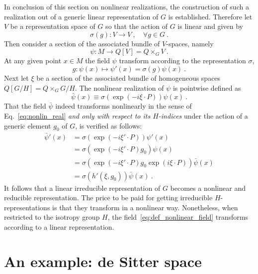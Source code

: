 \documentclass[11pt]{article}
\begin{document}
In conclusion of this section on nonlinear realizations, the 
construction of such a realization out of a generic linear 
representation of $G$ is established.
Therefore let $V$ be a representation space of $G$ so that the 
action of $G$ is linear and given by
\begin{displaymath}
	\sigma(g) : V \to V~,\quad \forall g  \in G~.
\end{displaymath}
Then consider a section of the associated bundle of $V$-spaces, 
namely
\begin{displaymath}
	\psi : M \to Q[V] = Q \times_G V~.
\end{displaymath}
At any given point $x \in M$ the field $\psi$ transform according 
to the representation $\sigma$,
\begin{displaymath}
	g : \psi(x) \mapsto \psi'(x) = \sigma(g) \psi(x)~.
\end{displaymath}
Next let $\xi$ be a section of the associated bundle of 
homogeneous spaces $Q[G/H] = Q \times_G G/H$. The nonlinear 
realization of $\psi$ is pointwise defined as
\begin{equation}\label{eq:def_nonlinear_field}
	\bar{\psi}(x) \equiv \sigma(\exp(-i\xi\cdot P))\psi(x)~.
\end{equation}
That the field $\bar{\psi}$ indeed transforms nonlinearly in the 
sense of Eq.~\eqref{eq:nonlin_real} \emph{and only with respect 
	to its $H$-indices} under the action of a generic element 
$g_0$ of $G$, is verified as follows:
%
\begin{displaymath}
\begin{split}
	\bar{\psi}'(x) &= \sigma(\exp(-i\xi'\cdot P)) \psi'(x) \\
	&= \sigma(\exp(-i\xi'\cdot P)g_0) \psi(x) \\
	&= \sigma(\exp(-i\xi'\cdot P)g_0\exp(i\xi\cdot P)) 
	\bar{\psi}(x) \\
	&= \sigma(h'(\xi,g_0)) \bar{\psi}(x)~.
\end{split}
\end{displaymath}
It follows that a linear irreducible representation of $G$ 
becomes a nonlinear and reducible representation. The price to be 
paid for getting irreducible $H$-representations is that they 
transform in a nonlinear way. Nonetheless, when restricted to the 
isotropy group $H$, the field~\eqref{eq:def_nonlinear_field} 
transforms according to a linear representation.

\section{An example: de Sitter space}
\end{document}

